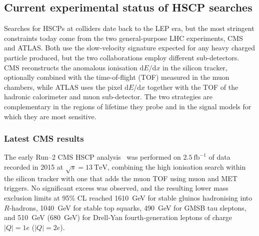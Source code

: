 \subsection{Current experimental status of HSCP searches}
\label{sec:hscp_status}

Searches for HSCPs at colliders date back to the LEP era, but the most stringent constraints today come from the two general-purpose LHC experiments, CMS and ATLAS. Both use the slow-velocity signature expected for any heavy charged particle produced, but the two collaborations employ different sub-detectors. CMS reconstructs the anomalous ionisation $\mathrm{d}E/\mathrm{d}x$ in the silicon tracker, optionally combined with the time-of-flight (TOF) measured in the muon chambers, while ATLAS uses the pixel $\mathrm{d}E/\mathrm{d}x$ together with the TOF of the hadronic calorimeter and muon sub-detector. The two strategies are complementary in the regions of lifetime they probe and in the signal models for which they are most sensitive.

\subsubsection{Latest CMS results}

The early Run--2 CMS HSCP analysis~\cite{HSCP_Run2_early} was performed on $2.5~\text{fb}^{-1}$ of data recorded in 2015 at $\sqrt{s} = 13~\text{TeV}$, combining the high ionisation search within the silicon tracker with one that adds the muon TOF using muon and MET triggers. No significant excess was observed, and the resulting lower mass exclusion limits at 95\% CL reached 1610~GeV for stable gluinos hadronising into $R$-hadrons, 1040~GeV for stable top squarks, 490~GeV for GMSB tau sleptons, and 510~GeV (680~GeV) for Drell-Yan fourth-generation leptons of charge $|Q| = 1e$ ($|Q| = 2e$).

